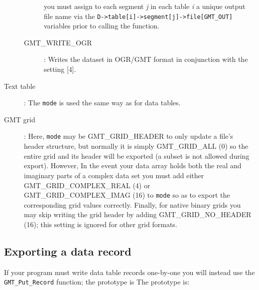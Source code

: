 \documentclass{report}
\begin{document}
\begin{description}
\begin{description}
you must assign to each segment \emph{j} in each table \emph{i} a unique output file name
via the \texttt{D->table[i]->segment[j]->file[GMT\_OUT]} variables prior to calling the function.
\item [GMT\_WRITE\_OGR]: Writes the dataset in OGR/GMT format in conjunction with the  setting [4].
\end{description}
\item [Text table]: The \texttt{mode} is used the same way as for data tables.
\item [GMT grid]: Here, \texttt{mode} may be GMT\_GRID\_HEADER to only update a file's header
structure, but normally it is simply GMT\_GRID\_ALL (0) so the entire
grid and its header will be exported (a subset is not allowed during export).
However, In the event your data array holds both the real and imaginary parts of a
complex data set you must add either GMT\_GRID\_COMPLEX\_REAL (4) or GMT\_GRID\_COMPLEX\_IMAG (16) to \texttt{mode}
so as to export the corresponding grid values correctly.  Finally, for native binary grids you may skip writing
the grid header by adding GMT\_GRID\_NO\_HEADER (16); this setting is ignored for other grid formats.
\end{description}

\subsection{Exporting a data record}

If your program must write data table records one-by-one you will instead use the
\texttt{GMT\_Put\_Record} function; the prototype is
The prototype is:
\end{document}
